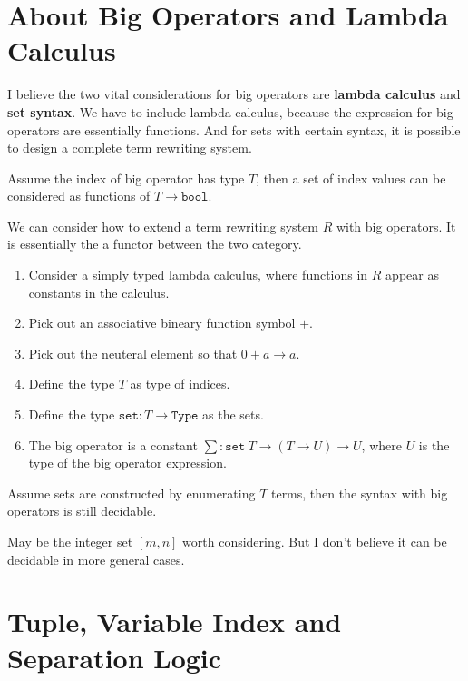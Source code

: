 \section{About Big Operators and Lambda Calculus}
I believe the two vital considerations for big operators are \textbf{lambda calculus} and \textbf{set syntax}. We have to include lambda calculus, because the expression for big operators are essentially functions. And for sets with certain syntax, it is possible to design a complete term rewriting system.

Assume the index of big operator has type $T$, then a set of index values can be considered as functions of $T \to \texttt{bool}$.

\begin{example}
  We can consider how to extend a term rewriting system $R$ with big operators. It is essentially the a functor between the two category.

  \begin{enumerate}
    \item Consider a simply typed lambda calculus, where functions in $R$ appear as constants in the calculus.
    \item Pick out an associative bineary function symbol $+$.
    \item Pick out the neuteral element so that $0 + a \to a$.
    \item Define the type $T$ as type of indices.
    \item Define the type $\texttt{set} : T \to \texttt{Type}$ as the sets.
    \item The big operator is a constant $\sum : \texttt{set}\ T \to (T \to U) \to U$, where $U$ is the type of the big operator expression.
  \end{enumerate}
\end{example}


\begin{example}
  Assume sets are constructed by enumerating $T$ terms, then the syntax with big operators is still decidable.
\end{example}

May be the integer set $[m, n]$ worth considering. But I don't believe it can be decidable in more general cases.


\section{Tuple, Variable Index and Separation Logic}

